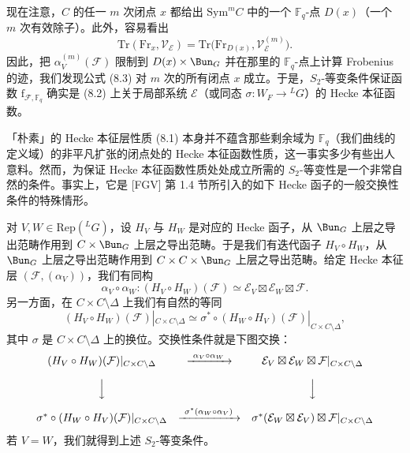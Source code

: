 现在注意，$C$ 的任一 $m$ 次闭点 $x$ 都给出 $\mathrm{Sym}^m C$ 中的一个 $\mathbb{F}_q$-点 $D(x)$（一个 $m$ 次有效除子）。此外，容易看出
\[
\mathrm{Tr}(\mathrm{Fr}_x, \mathcal{V}_{\mathcal{E}}) = \mathrm{Tr}\bigl(\mathrm{Fr}_{D(x)}, \mathcal{V}_{\mathcal{E}}^{(m)}\bigr).
\]
因此，把 $\alpha_V^{(m)}(\mathcal{F})$ 限制到 $D(x)\times \Bun_G$ 并在那里的 $\mathbb{F}_q$-点上计算 Frobenius 的迹，我们发现公式 (8.3) 对 $m$ 次的所有闭点 $x$ 成立。于是，$S_2$-等变条件保证函数 $\mathrm{f}_{\mathcal{F},\mathbb{F}_q}$ 确实是 (8.2) 上关于局部系统 $\mathcal{E}$（或同态 $\sigma : W_F \to {}^{L}G$）的 Hecke 本征函数。


「朴素」的 Hecke 本征层性质 (8.1) 本身并不蕴含那些剩余域为 $\mathbb{F}_q$（我们曲线的定义域）的非平凡扩张的闭点处的 Hecke 本征函数性质，这一事实多少有些出人意料。然而，为保证 Hecke 本征函数性质处处成立所需的 $S_2$-等变性是一个非常自然的条件。事实上，它是 [FGV] 第 1.4 节所引入的如下 Hecke 函子的一般交换性条件的特殊情形。

对 $V, W\in \mathrm{Rep}({}^{L}G)$，设 $H_V$ 与 $H_W$ 是对应的 Hecke 函子，从 $\Bun_G$ 上层之导出范畴作用到 $C\times \Bun_G$ 上层之导出范畴。于是我们有迭代函子 $H_V\circ H_W$，从 $\Bun_G$ 上层之导出范畴作用到 $C\times C\times \Bun_G$ 上层之导出范畴。给定 Hecke 本征层 $(\mathcal{F}, (\alpha_V))$，我们有同构
\[
\alpha_V\circ \alpha_W : (H_V\circ H_W)(\mathcal{F}) \simeq \mathcal{E}_V\boxtimes \mathcal{E}_W\boxtimes \mathcal{F}.
\]
另一方面，在 $C\times C\setminus\Delta$ 上我们有自然的等同
\[
(H_V\circ H_W)(\mathcal{F})|_{C\times C\setminus\Delta} \simeq \sigma^*\circ (H_W\circ H_V)(\mathcal{F})|_{C\times C\setminus\Delta},
\]
其中 $\sigma$ 是 $C\times C\setminus\Delta$ 上的换位。交换性条件就是下图交换：
\[
\begin{array}{ccc}
(H_V\circ H_W)(\mathcal{F})|_{C\times C\setminus\Delta} & \xrightarrow{\ \alpha_V\circ\alpha_W\ } & \mathcal{E}_V\boxtimes \mathcal{E}_W\boxtimes \mathcal{F}|_{C\times C\setminus\Delta}\\[10pt]
\Big\downarrow & & \Big\downarrow\\[10pt]
\sigma^*\circ (H_W\circ H_V)(\mathcal{F})|_{C\times C\setminus\Delta} & \xrightarrow{\ \sigma^*(\alpha_W\circ\alpha_V)\ } & \sigma^*(\mathcal{E}_W\boxtimes \mathcal{E}_V)\boxtimes \mathcal{F}|_{C\times C\setminus\Delta}
\end{array}
\]
若 $V = W$，我们就得到上述 $S_2$-等变条件。

